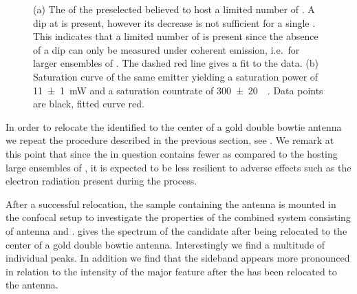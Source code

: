 \begin{figure}[!htb]
					\caption[Properties of a \nd containing a few \sivs]{(a) The \gtf of the preselected \nd believed to host a limited number of \sivs. A dip at \gtz is present, however its decrease is not sufficient for a single \siv. This indicates that a limited number of \sivs is present since the absence of a dip can only be measured under coherent emission, i.e.\ for larger ensembles of \sivs. The dashed red line gives a fit to the data. (b) Saturation curve of the same emitter yielding a saturation power of \SI[separate-uncertainty = true]{11\pm1}{\milli\watt} and a saturation countrate of \SI[separate-uncertainty = true]{300\pm20}{\kilo\cps}. Data points are black, fitted curve red.}
				\end{figure}

				In order to relocate the identified \nd to the center of a gold double bowtie antenna we repeat the \pp procedure described in the previous section, see . We remark at this point that since the \nd in question contains fewer \sivs as compared to the \nds hosting large ensembles of \sivs, it is expected to be less resilient to adverse effects such as the electron radiation present during the \pp process.
				
				After a successful relocation, the sample containing the antenna is mounted in the confocal setup to investigate the properties of the combined system consisting of antenna and \sivs.  gives the spectrum of the candidate \nd after being relocated to the center of a gold double bowtie antenna. Interestingly we find a multitude of individual peaks. In addition we find that the sideband appears more pronounced in relation to the intensity of the major feature after the \nd has been relocated to the antenna.

